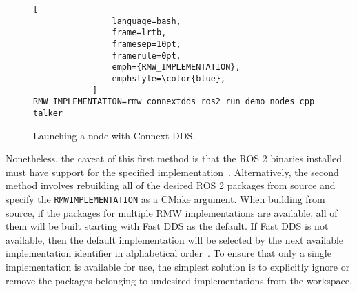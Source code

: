     \begin{figure}[thbp]
        \centering
            \begin{lstlisting}[
                language=bash,
                frame=lrtb,
                framesep=10pt,
                framerule=0pt,
                emph={RMW_IMPLEMENTATION},
                emphstyle=\color{blue},
            ]
RMW_IMPLEMENTATION=rmw_connextdds ros2 run demo_nodes_cpp talker
\end{lstlisting}
        \caption{Launching a node with Connext \ac{DDS}.}
        \label{fig:envrmw}
    \end{figure}

    Nonetheless, the caveat of this first method is that the \ac{ROS} 2 binaries installed must have support for the specified implementation~\cite{subrmw}. Alternatively, the second method involves rebuilding all of the desired \ac{ROS} 2 packages from source and specify the \small\texttt{RMW\smallunderscore IMPLEMENTATION} \normalsize as a CMake argument. When building from source, if the packages for multiple \ac{RMW} implementations are available, all of them will be built starting with Fast \ac{DDS} as the default. If Fast \ac{DDS} is not available, then the default implementation will be selected by the next available implementation identifier in alphabetical order~\cite{docsdds}. To ensure that only a single implementation is available for use, the simplest solution is to explicitly ignore or remove the packages belonging to undesired implementations from the workspace.
